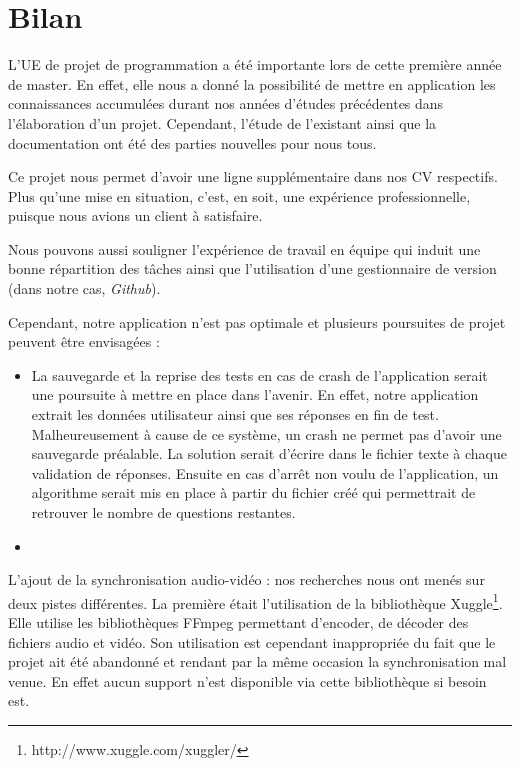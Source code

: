\chapter{Bilan}


L'UE de projet de programmation a été importante lors de cette première année de master. En effet, elle nous a donné la possibilité de mettre en application les connaissances accumulées durant nos années d'études précédentes dans l'élaboration d'un projet. Cependant, l'étude de l'existant ainsi que la documentation ont été des parties nouvelles pour nous tous.

Ce projet nous permet d'avoir une ligne supplémentaire dans nos CV respectifs. Plus qu'une mise en situation, c'est, en soit, une expérience professionnelle, puisque nous avions un client à satisfaire.

Nous pouvons aussi souligner l'expérience de travail en équipe qui induit une bonne répartition des tâches ainsi que l'utilisation d'une gestionnaire de version (dans notre cas, \textit{Github}).

Cependant, notre application n'est pas optimale et plusieurs poursuites de projet peuvent être envisagées :

\begin{itemize}
 \item La sauvegarde et la reprise des tests en cas de crash de l'application serait une poursuite à mettre en place dans l'avenir. En effet, notre application extrait les données utilisateur ainsi que ses réponses en fin de test. Malheureusement à cause de ce système, un crash ne permet pas d'avoir une sauvegarde préalable. La solution serait d'écrire dans le fichier texte à chaque validation de réponses. Ensuite en cas d'arrêt non voulu de l'application, un algorithme serait mis en place à partir du fichier créé qui permettrait de retrouver le nombre de questions restantes.
 \item 
\end{itemize}


L'ajout de la synchronisation audio-vidéo : nos recherches nous ont menés sur deux pistes différentes. La première était l'utilisation de la bibliothèque Xuggle\footnote{http://www.xuggle.com/xuggler/}. Elle utilise les bibliothèques FFmpeg permettant d'encoder, de décoder des fichiers audio et vidéo.
Son utilisation est cependant inappropriée du fait que le projet ait été abandonné et rendant par la même occasion la synchronisation mal venue. En effet aucun support n'est disponible via cette bibliothèque si besoin est.

